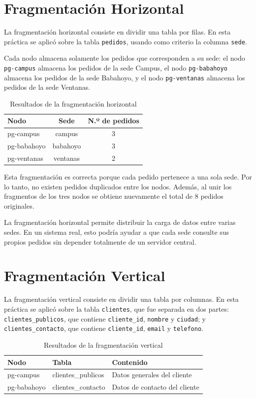 \documentclass[conference]{IEEEtran}
\begin{document}
\section{Fragmentación Horizontal}
La fragmentación horizontal consiste en dividir una tabla por filas. En esta práctica se aplicó sobre la tabla \texttt{pedidos}, usando como criterio la columna \texttt{sede}.

Cada nodo almacena solamente los pedidos que corresponden a su sede: el nodo \texttt{pg-campus} almacena los pedidos de la sede Campus, el nodo \texttt{pg-babahoyo} almacena los pedidos de la sede Babahoyo, y el nodo \texttt{pg-ventanas} almacena los pedidos de la sede Ventanas.

\begin{table}[htbp]
\caption{Resultados de la fragmentación horizontal}
\label{tab:horizontal}
\centering
\begin{tabular}{@{}lcc@{}}
\toprule
\textbf{Nodo} & \textbf{Sede} & \textbf{N.º de pedidos} \\
\midrule
pg-campus    & campus    & 3 \\
pg-babahoyo  & babahoyo  & 3 \\
pg-ventanas  & ventanas  & 2 \\
\bottomrule
\end{tabular}
\end{table}

Esta fragmentación es correcta porque cada pedido pertenece a una sola sede. Por lo tanto, no existen pedidos duplicados entre los nodos. Además, al unir los fragmentos de los tres nodos se obtiene nuevamente el total de 8 pedidos originales.

La fragmentación horizontal permite distribuir la carga de datos entre varias sedes. En un sistema real, esto podría ayudar a que cada sede consulte sus propios pedidos sin depender totalmente de un servidor central.

\section{Fragmentación Vertical}
La fragmentación vertical consiste en dividir una tabla por columnas. En esta práctica se aplicó sobre la tabla \texttt{clientes}, que fue separada en dos partes: \texttt{clientes\_publicos}, que contiene \texttt{cliente\_id}, \texttt{nombre} y \texttt{ciudad}; y \texttt{clientes\_contacto}, que contiene \texttt{cliente\_id}, \texttt{email} y \texttt{telefono}.

\begin{table}[htbp]
\caption{Resultados de la fragmentación vertical}
\label{tab:vertical}
\centering
\begin{tabular}{@{}lll@{}}
\toprule
\textbf{Nodo} & \textbf{Tabla} & \textbf{Contenido} \\
\midrule
pg-campus   & clientes\_publicos & Datos generales del cliente \\
pg-babahoyo & clientes\_contacto & Datos de contacto del cliente \\
\bottomrule
\end{tabular}
\end{table}
\end{document}
